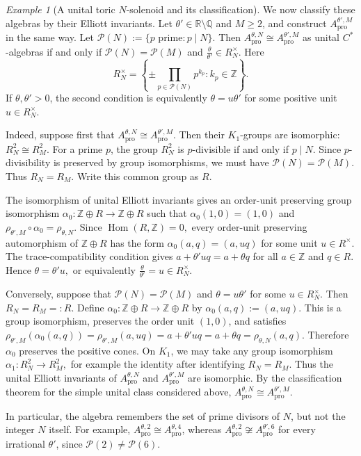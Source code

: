 \documentclass[11pt]{amsart}
\theoremstyle{definition}
\theoremstyle{remark}
\newtheorem{example}[theorem]{Example}
\newcommand{\Z}{\mathbb{Z}}
\newcommand{\R}{\mathbb{R}}
\newcommand{\Q}{\mathbb Q}
\newcommand{\ex}{\mathrm{pro}}
\begin{document}
\begin{example}[A unital toric $N$-solenoid and its classification]
We now classify these algebras by their Elliott invariants. Let
\(\theta'\in\R\setminus\Q\) and \(M\geq2\), and construct
\(A_{\ex}^{\theta',M}\) in the same way. Let $\mathcal P(N):=\{p\text{ prime}:p\mid N\}.$
Then $A_{\ex}^{\theta,N}\cong A_{\ex}^{\theta',M}$
as unital \(C^*\)-algebras if and only if $\mathcal P(N)=\mathcal P(M)$
and $\frac{\theta}{\theta'}\in R_N^\times.$
Here
\[
R_N^\times
=
\left\{
\pm\prod_{p\in\mathcal P(N)}p^{k_p}
:
k_p\in\Z
\right\}.
\]
If $\theta,\theta'>0$, the second condition is equivalently $\theta=u\theta'$
for some positive unit $u\in R_N^\times$.

Indeed, suppose first that $A_{\ex}^{\theta,N}\cong A_{\ex}^{\theta',M}.$
Then their \(K_1\)-groups are isomorphic:
$R_N^2\cong R_M^2.$
For a prime $p$, the group $R_N^2$ is $p$-divisible if and only if
$p\mid N$. Since $p$-divisibility is preserved by group isomorphisms, we
must have $\mathcal P(N)=\mathcal P(M).$
Thus $R_N=R_M.$
Write this common group as $R$.

The isomorphism of unital Elliott invariants gives an order-unit preserving
group isomorphism $\alpha_0\colon \Z\oplus R\to \Z\oplus R$
such that $\alpha_0(1,0)=(1,0)$
and $\rho_{\theta',M}\circ \alpha_0=\rho_{\theta,N}.$
Since $\operatorname{Hom}(R,\Z)=0,$
every order-unit preserving automorphism of $\Z\oplus R$ has the form $\alpha_0(a,q)=(a,uq)$
for some unit \(u\in R^\times\). The trace-compatibility condition gives $a+\theta' u q=a+\theta q$
for all $a\in\Z$ and $q\in R$. Hence $\theta=\theta'u,$
or equivalently $\frac{\theta}{\theta'}=u\in R_N^\times.$

Conversely, suppose that $\mathcal P(N)=\mathcal P(M)$
and $\theta=u\theta'$
for some $u\in R_N^\times$. Then $R_N=R_M=:R$.
Define $\alpha_0\colon \Z\oplus R\to \Z\oplus R$ by $\alpha_0(a,q):=(a,uq).$
This is a group isomorphism, preserves the order unit $(1,0)$, and satisfies
$\rho_{\theta',M}(\alpha_0(a,q))=\rho_{\theta',M}(a,uq)=a+\theta'uq=a+\theta q=\rho_{\theta,N}(a,q).$
Therefore $\alpha_0$ preserves the positive cones. On \(K_1\), we may take
any group isomorphism $\alpha_1\colon R_N^2\to R_M^2,$
for example the identity after identifying \(R_N=R_M\). Thus the unital
Elliott invariants of \(A_{\ex}^{\theta,N}\) and \(A_{\ex}^{\theta',M}\) are
isomorphic. By the classification theorem for the simple unital class considered
above, $A_{\ex}^{\theta,N}\cong A_{\ex}^{\theta',M}.$

In particular, the algebra remembers the set of prime divisors of $N$, but
not the integer $N$ itself. For example, $A_{\ex}^{\theta,2}\cong A_{\ex}^{\theta,4}$, whereas
$A_{\ex}^{\theta,2}\not\cong A_{\ex}^{\theta',6}$ for every irrational
$\theta'$, since $\mathcal P(2)\neq\mathcal P(6)$.
\end{example}
\end{document}
